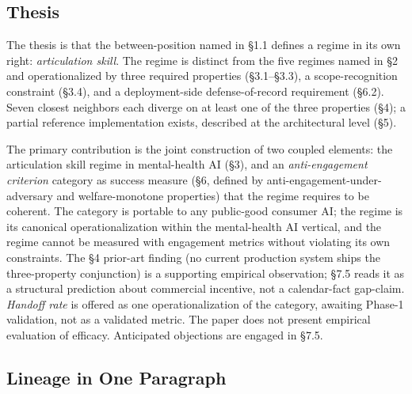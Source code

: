 \documentclass[letterpaper]{article}
\begin{document}
\subsection{Thesis}

The thesis is that the between-position named in \S1.1 defines a regime in its own right: \emph{articulation skill}. The regime is distinct from the five regimes named in \S2 and operationalized by three required properties (\S3.1--\S3.3), a scope-recognition constraint (\S3.4), and a deployment-side defense-of-record requirement (\S6.2). Seven closest neighbors each diverge on at least one of the three properties (\S4); a partial reference implementation exists, described at the architectural level (\S5).

The primary contribution is the joint construction of two coupled elements: the articulation skill regime in mental-health AI (\S3), and an \emph{anti-engagement criterion} category as success measure (\S6, defined by anti-engagement-under-adversary and welfare-monotone properties) that the regime requires to be coherent. The category is portable to any public-good consumer AI; the regime is its canonical operationalization within the mental-health AI vertical, and the regime cannot be measured with engagement metrics without violating its own constraints. The \S4 prior-art finding (no current production system ships the three-property conjunction) is a supporting empirical observation; \S7.5 reads it as a structural prediction about commercial incentive, not a calendar-fact gap-claim. \emph{Handoff rate} is offered as one operationalization of the category, awaiting Phase-1 validation, not as a validated metric. The paper does not present empirical evaluation of efficacy. Anticipated objections are engaged in \S7.5.

\subsection{Lineage in One Paragraph}
\end{document}
